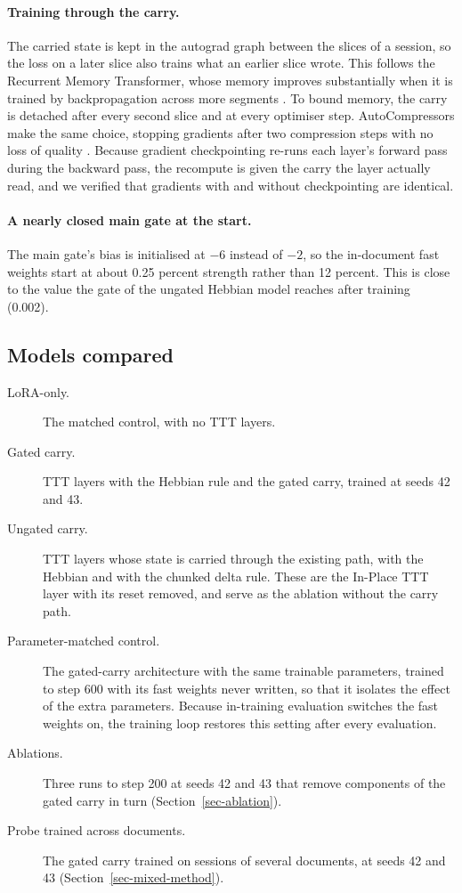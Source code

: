 \documentclass[12pt,a4paper]{report}
\begin{document}
\paragraph{Training through the carry.} The carried state is kept in the autograd graph between the slices of a session, so the loss on a later slice also trains what an earlier slice wrote. This follows the Recurrent Memory Transformer, whose memory improves substantially when it is trained by backpropagation across more segments \citep{bulatov2022rmt}. To bound memory, the carry is detached after every second slice and at every optimiser step. AutoCompressors make the same choice, stopping gradients after two compression steps with no loss of quality \citep{chevalier2023adapting}. Because gradient checkpointing re-runs each layer's forward pass during the backward pass, the recompute is given the carry the layer actually read, and we verified that gradients with and without checkpointing are identical.

\paragraph{A nearly closed main gate at the start.} The main gate's bias is initialised at $-6$ instead of $-2$, so the in-document fast weights start at about 0.25 percent strength rather than 12 percent. This is close to the value the gate of the ungated Hebbian model reaches after training (0.002).

\subsection{Models compared}

\begin{description}
  \item[LoRA-only.] The matched control, with no TTT layers.
  \item[Gated carry.] TTT layers with the Hebbian rule and the gated carry, trained at seeds 42 and 43.
  \item[Ungated carry.] TTT layers whose state is carried through the existing path, with the Hebbian and with the chunked delta rule. These are the In-Place TTT layer with its reset removed, and serve as the ablation without the carry path.
  \item[Parameter-matched control.] The gated-carry architecture with the same trainable parameters, trained to step 600 with its fast weights never written, so that it isolates the effect of the extra parameters. Because in-training evaluation switches the fast weights on, the training loop restores this setting after every evaluation.
  \item[Ablations.] Three runs to step 200 at seeds 42 and 43 that remove components of the gated carry in turn (Section~\ref{sec-ablation}).
  \item[Probe trained across documents.] The gated carry trained on sessions of several documents, at seeds 42 and 43 (Section~\ref{sec-mixed-method}).
\end{description}
\end{document}
